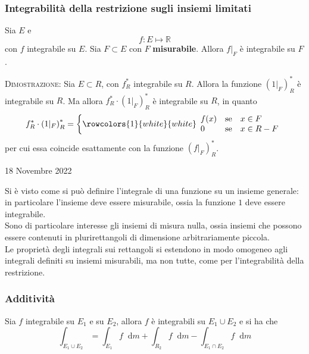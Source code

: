 \documentclass[a4paper]{extarticle}
\newcommand*\dif{\mathop{}\!\mathrm{d}}
\begin{document}
\vspace{1em}
\subsubsection{Integrabilità della restrizione sugli insiemi limitati}
Sia $E$ e 
\[f : E \longmapsto \mathbb{R}\]
con $f$ integrabile su $E$. Sia $F \subset E$ con $F$ \textbf{misurabile}. Allora $f \vert_F$ è integrabile su $F$.

\vspace{2em}
\noindent
\normalfont \normalsize
\textsc{Dimostrazione}: Sia $E \subset R$, con $f^*_R$ integrabile su $R$. Allora la funzione $\left(1 \vert_F\right)^*_R$ è integrabile su $R$. Ma allora $f^*_R \cdot \left(1 \vert_F\right)^*_R$ è integrabile su $R$, in quanto
\[
    f^*_R \cdot \left(1 \vert_F\right)^*_R = \left\{\rowcolors{1}{white}{white}    
    \begin{array}{lll}
        f(x) & \text{se} & x \in F\\
        0   & \text{se}  & x \in R - F\\
    \end{array}
    \right.
\]
per cui essa coincide esattamente con la funzione $\left(f \vert _F\right)^*_R$.

\newpage
\noindent
\begin{center}
    18 Novembre 2022
\end{center}
Si è visto come si può definire l'integrale di una funzione su un insieme generale: in particolare l'insieme deve essere misurabile, ossia la funzione $1$ deve essere integrabile.\\
Sono di particolare interesse gli insiemi di misura nulla, ossia insiemi che possono essere contenuti in plurirettangoli di dimensione arbitrariamente piccola.\\
Le proprietà degli integrali sui rettangoli si estendono in modo omogeneo agli integrali definiti su insiemi misurabili, ma non tutte, come per l'integrabilità della restrizione.

\vspace{1em}
\subsubsection{Additività}
Sia $f$ integrabile su $E_1$ e su $E_2$, allora $f$ è integrabili su $E_1 \cup E_2$ e si ha che
\[\int_{E_1 \cup E_2} = \int_{E_1} f \dif m + \int_{R_2} f \dif m - \int_{E_1 \cap E_2} f \dif m\]
\end{document}
